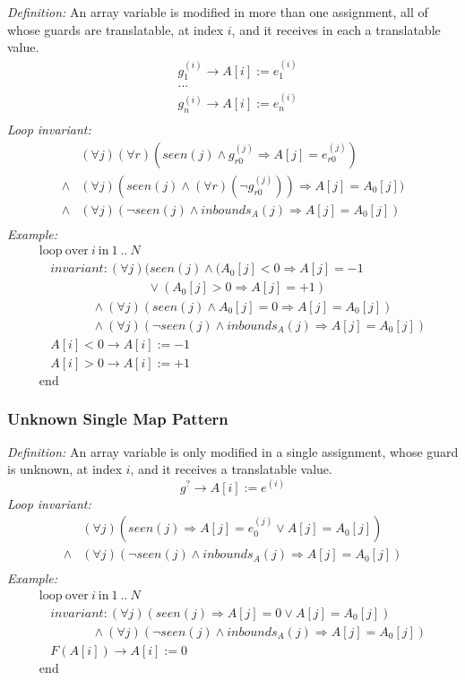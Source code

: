 \documentclass[a4paper,10pt]{article}
\newcommand{\idx}{\ensuremath{i}\xspace}
\newcommand{\at}[1]{{(#1)}}
\newcommand{\KWloop}{\ensuremath{\mathrm{loop}~}}
\newcommand{\KWend}{\ensuremath{\mathrm{end}~}}
\newcommand{\KWover}{\ensuremath{\mathrm{over}~}}
\newcommand{\KWin}{\ensuremath{~\mathrm{in}~}}
\newcommand{\impl}{\ensuremath{\Longrightarrow}}
\newcommand{\inbounds}[2]{\ensuremath{\mathit{inbounds}_{#1}(#2)}\xspace}
\newcommand{\seen}[1]{\ensuremath{\mathit{seen}(#1)}\xspace}
\newcommand{\loopinvariant}{\noindent\textit{Loop invariant:}\xspace}
\newcommand{\patterndef}{\noindent\textit{Definition:}\xspace}
\newcommand{\patternexample}{\noindent\textit{Example:}\xspace}
\begin{document}
\patterndef An array variable is modified in more than one assignment, all
of whose guards are translatable, at index \idx, and it receives in each a
translatable value.
%
\begin{eqnarray*}
&g_1^\at{\idx} \rightarrow A[\idx] := e_1^\at{\idx}\\
&...\\
&g_n^\at{\idx} \rightarrow A[\idx] := e_n^\at{\idx}\\
\end{eqnarray*}
%
\loopinvariant
%
\begin{eqnarray*}
&(\forall j)(\forall r)(\seen{j} \land g_{r0}^\at{j} \impl A[j] = e_{r0}^\at{j}) \\
\land&(\forall j)(\seen{j} \land (\forall r) (\neg g_{r0}^\at{j})) \impl A[j] = A_0[j]) \\
\land&
 (\forall j)(\neg \seen{j} \land \inbounds{A}{j} \impl A[j] = A_0[j])\\
\end{eqnarray*}
%
\patternexample
$$\begin{array}{l}
  \KWloop \KWover i \KWin 1~..~N \\
  ~~~~ \textit{invariant}: (\forall j)(\seen{j} \land (A_0[j] < 0 \impl A[j] = -1\\
  ~~~~~~~~~~~~~~~~~~~~~~~~~~~~~~~~~~~~~~~ \lor (A_0[j] > 0 \impl A[j] = +1)\\
  ~~~~~~~~~~~~~~~~~~~ \land (\forall j)(\seen{j} \land A_0[j] = 0 \impl A[j] = A_0[j])\\
  ~~~~~~~~~~~~~~~~~~~ \land (\forall j)(\neg \seen{j} \land \inbounds{A}{j} \impl A[j] = A_0[j])\\
  ~~~~ A[i] < 0 \rightarrow A[i] := -1\\
  ~~~~ A[i] > 0 \rightarrow A[i] := +1\\
  \KWend
\end{array}$$

\subsubsection*{Unknown Single Map Pattern}

\patterndef An array variable is only modified in a single assignment, whose
guard is unknown, at index \idx, and it receives a translatable value.
%
$$g^? \rightarrow A[\idx] := e^\at{\idx}$$
%
\loopinvariant
%
\begin{eqnarray*}
&(\forall j)(\seen{j} \impl A[j] = e_0^\at{j} \lor A[j] = A_0[j]) \\
\land&
 (\forall j)(\neg \seen{j} \land \inbounds{A}{j} \impl A[j] = A_0[j])\\
\end{eqnarray*}
%
\patternexample
$$\begin{array}{l}
  \KWloop \KWover i \KWin 1~..~N \\
  ~~~~ \textit{invariant}: (\forall j)(\seen{j} \impl A[j] = 0 \lor A[j]=A_0[j])\\
  ~~~~~~~~~~~~~~~~~~~ \land (\forall j)(\neg \seen{j} \land \inbounds{A}{j} \impl A[j] = A_0[j])\\
  ~~~~ F(A[i]) \rightarrow A[i] := 0\\
  \KWend
\end{array}$$
\end{document}
